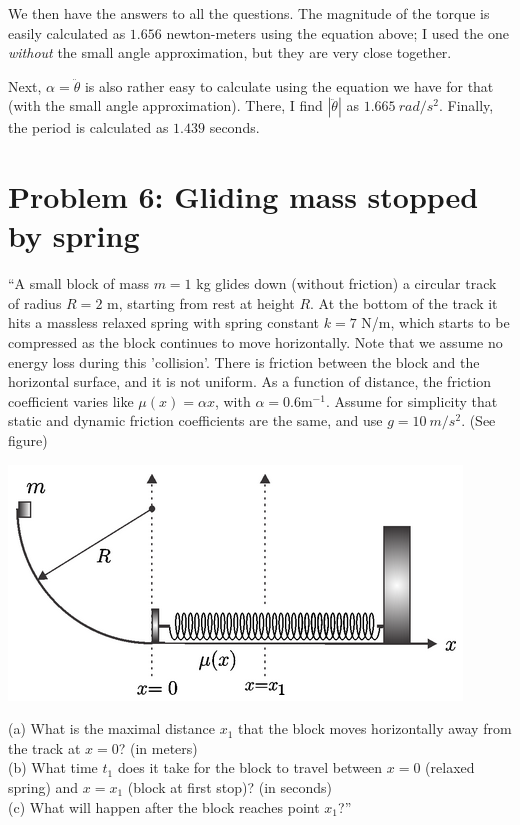 \documentclass[8.01x]{subfiles}
\begin{document}
We then have the answers to all the questions. The magnitude of the torque is easily calculated as $1.656$ newton-meters using the equation above; I used the one \emph{without} the small angle approximation, but they are very close together.

Next, $\alpha = \ddot{\theta}$ is also rather easy to calculate using the equation we have for that (with the small angle approximation). There, I find $|\ddot{\theta}|$ as $\SI{1.665}{rad/s^2}$. Finally, the period is calculated as $1.439$ seconds.

\section{Problem 6: Gliding mass stopped by spring}

``A small block of mass $m = 1$ kg glides down (without friction) a circular track of radius $R = 2$ m, starting from rest at height $R$. At the bottom of the track it hits a massless relaxed spring with spring constant $k = 7$ N/m, which starts to be compressed as the block continues to move horizontally. Note that we assume no energy loss during this 'collision'. There is friction between the block and the horizontal surface, and it is not uniform. As a function of distance, the friction coefficient varies like $\mu(x)=\alpha x$, with $\alpha= 0.6  \text{m}^{-1}$. Assume for simplicity that static and dynamic friction coefficients are the same, and use $g = \SI{10}{m/s^2}$. (See figure)

\begin{center}
\includegraphics[scale=0.65]{Graphics/finalexam_p6}
\end{center}

(a) What is the maximal distance $x_1$ that the block moves horizontally away from the track at $x = 0$? (in meters)\\
(b) What time $t_1$ does it take for the block to travel between $x = 0$ (relaxed spring) and $x = x_1$ (block at first stop)? (in seconds)\\
(c) What will happen after the block reaches point $x_1$?''
\end{document}
